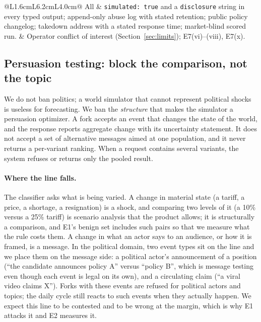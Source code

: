 \documentclass[11pt]{article}
\begin{document}
\begin{table}[htbp]
\begin{tabular}{@{}L{1.6cm}L{6.2cm}L{4.0cm}@{}}
All & \texttt{simulated: true} and a \texttt{disclosure} string in every typed output; append-only abuse log with stated retention; public policy changelog; takedown address with a stated response time; market-blind scored run. & Operator conflict of interest (Section~\ref{sec:limits}); E7(vi)--(viii), E7(x). \\
\bottomrule
\end{tabular}
\caption{Proposed rules by harm. ``Enforced where'' names the layer that carries the rule; a rule only in a terms-of-service page is not counted. Each rule is mapped to the audit or conformance check that tests it (Section~\ref{sec:protocols}); rules enforced by contract, such as ``no campaign customers'', can be checked only weakly.}
\label{tab:policies}
\end{table}

\subsection{Persuasion testing: block the comparison, not the topic}
\label{sec:persuasion}

We do not ban politics; a world simulator that cannot represent political shocks is useless for forecasting. We ban the \emph{structure} that makes the simulator a persuasion optimizer. A fork accepts an event that changes the state of the world, and the response reports aggregate change with its uncertainty statement. It does not accept a set of alternative messages aimed at one population, and it never returns a per-variant ranking. When a request contains several variants, the system refuses or returns only the pooled result.

\paragraph{Where the line falls.} The classifier asks what is being varied. A change in material state (a tariff, a price, a shortage, a resignation) is a shock, and comparing two levels of it (a 10\% versus a 25\% tariff) is scenario analysis that the product allows; it is structurally a comparison, and E1's benign set includes such pairs so that we measure what the rule costs them. A change in what an actor says to an audience, or how it is framed, is a message. In the political domain, two event types sit on the line and we place them on the message side: a political actor's announcement of a position (``the candidate announces policy A'' versus ``policy B'', which is message testing even though each event is legal on its own), and a circulating claim (``a viral video claims X''). Forks with these events are refused for political actors and topics; the daily cycle still reacts to such events when they actually happen. We expect this line to be contested and to be wrong at the margin, which is why E1 attacks it and E2 measures it.
\end{document}
